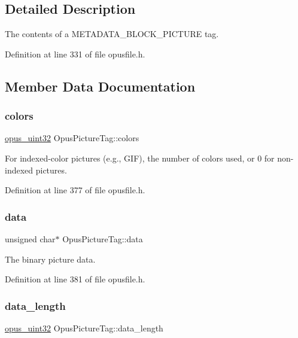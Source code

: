\subsection{Detailed Description}
The contents of a M\+E\+T\+A\+D\+A\+T\+A\+\_\+\+B\+L\+O\+C\+K\+\_\+\+P\+I\+C\+T\+U\+RE tag. 

Definition at line 331 of file opusfile.\+h.



\subsection{Member Data Documentation}
\mbox{\label{struct_opus_picture_tag_a6fe2f98151fa32a8e2fd13f9309bd1a2}} 
\subsubsection{\texorpdfstring{colors}{colors}}
{\footnotesize\ttfamily \mbox{\hyperlink{opus__types_8h_a643eaaadb9ef6cd44308e0299d8cd8ce}{opus\+\_\+uint32}} Opus\+Picture\+Tag\+::colors}

For indexed-\/color pictures (e.\+g., G\+IF), the number of colors used, or 0 for non-\/indexed pictures. 

Definition at line 377 of file opusfile.\+h.

\mbox{\label{struct_opus_picture_tag_a0514cb1431547c8b3042b9f3bc9b694f}} 
\subsubsection{\texorpdfstring{data}{data}}
{\footnotesize\ttfamily unsigned char$\ast$ Opus\+Picture\+Tag\+::data}

The binary picture data. 

Definition at line 381 of file opusfile.\+h.

\mbox{\label{struct_opus_picture_tag_aaa458d48cd3c9c86b54614389f5b726d}} 
\subsubsection{\texorpdfstring{data\_length}{data\_length}}
{\footnotesize\ttfamily \mbox{\hyperlink{opus__types_8h_a643eaaadb9ef6cd44308e0299d8cd8ce}{opus\+\_\+uint32}} Opus\+Picture\+Tag\+::data\+\_\+length}

